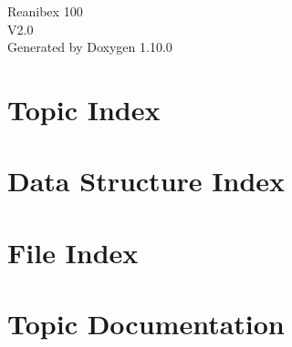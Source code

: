 \documentclass[twoside]{book}
\newcommand{\+}{\discretionary{\mbox{\scriptsize$\hookleftarrow$}}{}{}}
\newcommand{\clearemptydoublepage}{%
    \newpage{\pagestyle{empty}\cleardoublepage}%
  }
\begin{document}
  \raggedbottom
    \hypersetup{pageanchor=false,
                bookmarksnumbered=true,
                pdfencoding=unicode
               }
  \begin{titlepage}
  \vspace*{7cm}
  \begin{center}%
  {\Large Reanibex 100}\\
  [1ex]\large V2.\+0 \\
  \vspace*{1cm}
  {\large Generated by Doxygen 1.10.0}\\
  \end{center}
  \end{titlepage}
  \clearemptydoublepage
  \tableofcontents
  \clearemptydoublepage
  \hypersetup{pageanchor=true}



\chapter{Topic Index}

\chapter{Data Structure Index}

\chapter{File Index}

\chapter{Topic Documentation}







\end{document}

